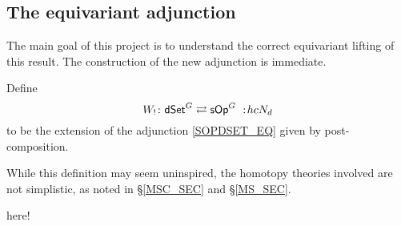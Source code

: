 \documentclass[a4paper,10pt
,draft
]{article}%
\renewcommand{\1}{\eta}%
\begin{document}

\subsection{The equivariant adjunction}

The main goal of this project \cite{BP_geo,BP_edss,Per_eds} is to understand the correct equivariant lifting of this result.
The construction of the new adjunction is immediate.

\begin{definition}
      Define
      \[
            W_!\colon \mathsf{dSet}^G \rightleftarrows \mathsf{sOp}^G\ :\! hcN_d
      \]
      to be the
      extension of the adjunction \eqref{SOPDSET_EQ}
      given by post-composition.
\end{definition}

While this definition may seem uninspired, the homotopy theories involved are not simplistic, as noted in \S \ref{MSC_SEC} and \S \ref{MS_SEC}.

here!

\end{document}
